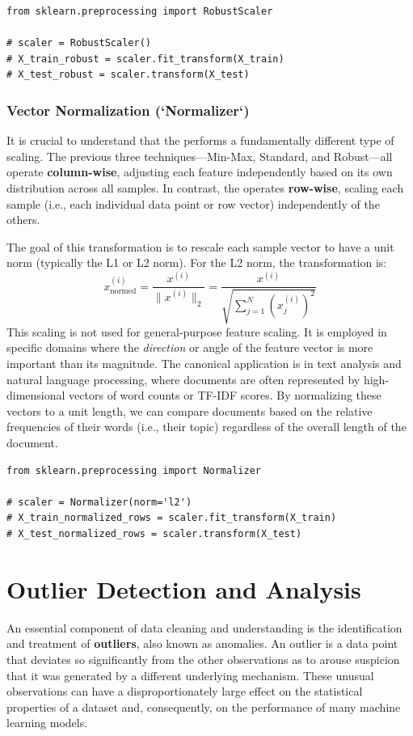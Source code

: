\begin{itemize}
\begin{verbatim}
from sklearn.preprocessing import RobustScaler

# scaler = RobustScaler()
# X_train_robust = scaler.fit_transform(X_train)
# X_test_robust = scaler.transform(X_test)
\end{verbatim}

\subsubsection{Vector Normalization (`Normalizer`)}
It is crucial to understand that the  performs a fundamentally different type of scaling. The previous three techniques—Min-Max, Standard, and Robust—all operate \textbf{column-wise}, adjusting each feature independently based on its own distribution across all samples. In contrast, the  operates \textbf{row-wise}, scaling each sample (i.e., each individual data point or row vector) independently of the others.

The goal of this transformation is to rescale each sample vector to have a unit norm (typically the L1 or L2 norm). For the L2 norm, the transformation is:
$$ x_{\text{normed}}^{(i)} = \frac{x^{(i)}}{\|x^{(i)}\|_2} = \frac{x^{(i)}}{\sqrt{\sum_{j=1}^N (x_j^{(i)})^2}} $$
This scaling is not used for general-purpose feature scaling. It is employed in specific domains where the \textit{direction} or angle of the feature vector is more important than its magnitude. The canonical application is in text analysis and natural language processing, where documents are often represented by high-dimensional vectors of word counts or TF-IDF scores. By normalizing these vectors to a unit length, we can compare documents based on the relative frequencies of their words (i.e., their topic) regardless of the overall length of the document.

\begin{verbatim}
from sklearn.preprocessing import Normalizer

# scaler = Normalizer(norm='l2')
# X_train_normalized_rows = scaler.fit_transform(X_train)
# X_test_normalized_rows = scaler.transform(X_test)
\end{verbatim}

\section{Outlier Detection and Analysis}
\label{sec:outlier_detection}

An essential component of data cleaning and understanding is the identification and treatment of \textbf{outliers}, also known as anomalies. An outlier is a data point that deviates so significantly from the other observations as to arouse suspicion that it was generated by a different underlying mechanism. These unusual observations can have a disproportionately large effect on the statistical properties of a dataset and, consequently, on the performance of many machine learning models.


\end{itemize}
